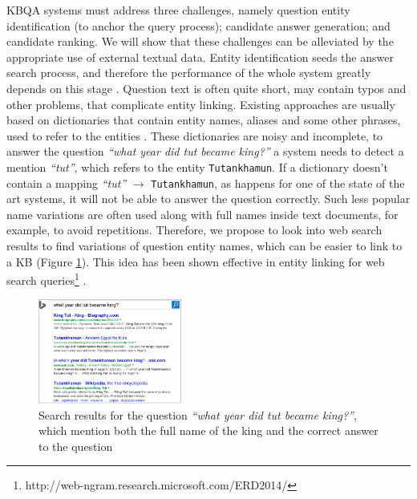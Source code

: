 KBQA systems must address three challenges, namely question entity identification (to anchor the query process); candidate answer generation; and candidate ranking.
We will show that these challenges can be alleviated by the appropriate use of external textual data.
Entity identification seeds the answer search process, and therefore the performance of the whole system greatly depends on this stage \cite{yao-scratch-qa-naacl2015}.
Question text is often quite short, may contain typos and other problems, that complicate entity linking.
Existing approaches are usually based on dictionaries that contain entity names, aliases and some other phrases, used to refer to the entities \cite{SPITKOVSKY12.266}.
These dictionaries are noisy and incomplete, \eg to answer the question \textit{``what year did tut became king?''} a system needs to detect a mention \textit{``tut''}, which refers to the entity \texttt{Tutankhamun}.
If a dictionary doesn't contain a mapping \textit{``tut''} $\rightarrow$ \texttt{Tutankhamun}, as happens for one of the state of the art systems, it will not be able to answer the question correctly.
Such less popular name variations are often used along with full names inside text documents, for example, to avoid repetitions.
Therefore, we propose to look into web search results to find variations of question entity names, which can be easier to link to a KB (Figure \ref{fig:web_search_entitylink}).
This idea has been shown effective in entity linking for web search queries\footnote{http://web-ngram.research.microsoft.com/ERD2014/} \cite{SMAPH_ERD:2014}.

\begin{figure}[!ht]
\centering
\includegraphics[width=0.42\textwidth]{img/web_search_entitylink}
\vspace{-3mm}
\caption{Search results for the question \textit{``what year did tut became king?''}, which mention both the full name of the king and the correct answer to the question}
\label{fig:web_search_entitylink}
\vspace{-4mm}
\end{figure}

